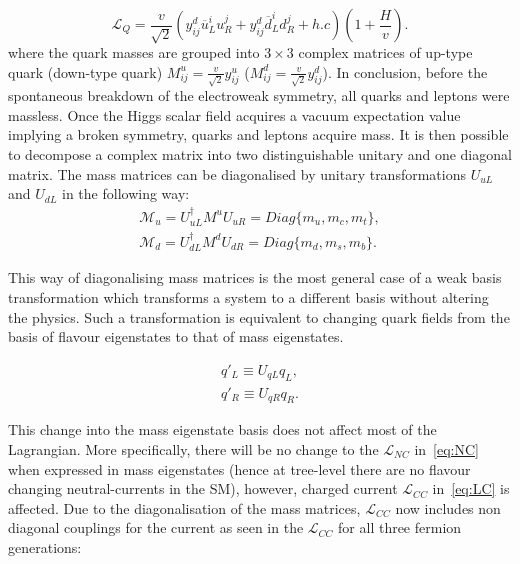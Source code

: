 \begin{equation}
	\mathcal{L}_{Q}=\frac{v}{\sqrt{2}}(y^{d}_{ij}\overline{u}^{i}_{L} u^{j}_{R} + {y}_{ij}^{d}\overline{d}^{i}_{L} d^{j}_{R} + h.c)(1+\frac{H}{v}).
	\label{eq:SSB4}
\end{equation}
where the quark masses are grouped into $3\times3$ complex matrices of up-type quark (down-type quark) $M^{u}_{ij}=\frac{v}{\sqrt{2}}y_{ij}^{u}$ ($M^{d}_{ij}=\frac{v}{\sqrt{2}}y_{ij}^{d}$).
In conclusion, before the spontaneous breakdown of the electroweak symmetry, all quarks and leptons were massless. Once the Higgs scalar field acquires a vacuum expectation value implying a broken symmetry, quarks and leptons acquire mass. It is then possible to decompose a complex matrix into two distinguishable unitary and one diagonal matrix. The mass matrices can be diagonalised by unitary transformations $U_{uL}$ and $ U_{dL}$ in the following way:
\begin{equation}
\begin{split}
	\mathcal{M}_{u} = U^{\dagger}_{uL}M^{u}U_{uR} = Diag\{m_{u},m_{c},m_{t}\},
\\
	\mathcal{M}_{d} = U^{\dagger}_{dL}M^{d}U_{dR} = Diag\{m_{d},m_{s},m_{b}\}.
\end{split}
	\label{eq:unit}
\end{equation}

This way of diagonalising mass matrices is the most general case of a weak basis transformation which transforms a system to a different basis without altering the physics. Such a transformation is equivalent to changing quark fields from the basis of flavour eigenstates to that of mass eigenstates.

\begin{equation}
\begin{split}
q'_{L} \equiv U_{qL} q_{L},
\\
q'_{R} \equiv U_{qR} q_{R}.
\end{split}
\end{equation}

This change into the mass eigenstate basis does not affect most of the Lagrangian. More specifically, there will be no change to the $\mathcal{L}_{NC}$ in~\autoref{eq:NC} when expressed in mass eigenstates (hence at tree-level there are no flavour changing neutral-currents in the \gls{SM}), however, charged current $\mathcal{L}_{CC}$ in~\autoref{eq:LC} is affected. Due to the diagonalisation of the mass matrices, $\mathcal{L}_{CC}$ now includes non diagonal couplings for the current as seen in the $\mathcal{L}_{CC}$ for all three fermion generations:


